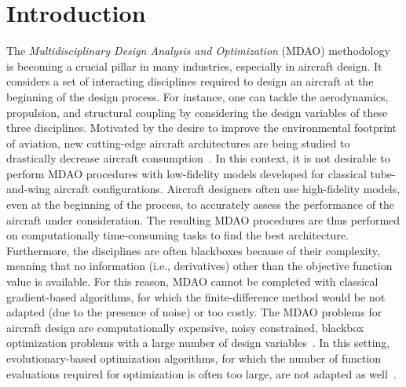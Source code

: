 \section{Introduction}

{\color{black} The \textit{Multidisciplinary Design Analysis and Optimization} (MDAO) methodology~\cite{cramerProblemFormulationMultidisciplinary1994} is becoming a crucial pillar in many industries, especially in aircraft design. It considers a set of interacting disciplines required to design an aircraft at the beginning of the design process. For instance, one can tackle the aerodynamics, propulsion, and structural coupling by considering the design variables of these three disciplines. Motivated by the desire to improve the environmental footprint of aviation, new cutting-edge aircraft architectures are being studied to drastically decrease aircraft consumption~\cite{schmollgruber2019multidisciplinary, priemEfficientApplicationBayesian2020a, bartoliAdaptiveModelingStrategy2019, BouhlelEfficientglobaloptimization2018,Mixed_Paul_PLS}.
In this context, it is not desirable to perform MDAO procedures with low-fidelity models developed for classical tube-and-wing aircraft configurations. Aircraft designers often use high-fidelity models, even at the beginning of the process, to accurately assess the performance of the aircraft under consideration. The resulting MDAO procedures are  thus performed on computationally time-consuming tasks to find the best architecture. Furthermore, the disciplines are often blackboxes because of their complexity, meaning that no information (i.e., derivatives) other than the objective function value is available. For this reason, MDAO cannot be completed with classical gradient-based algorithms, for which the finite-difference method would be not adapted (due to the presence of noise) or too costly.  The MDAO problems for aircraft design are computationally expensive, noisy constrained, blackbox optimization problems with a large number of design variables~\cite{bartoliAdaptiveModelingStrategy2019, feliot2016design}. In this setting, evolutionary-based optimization algorithms, for which the number of function evaluations required for optimization is often too large, are not adapted as well~\cite{schmollgruber2019multidisciplinary}. }


